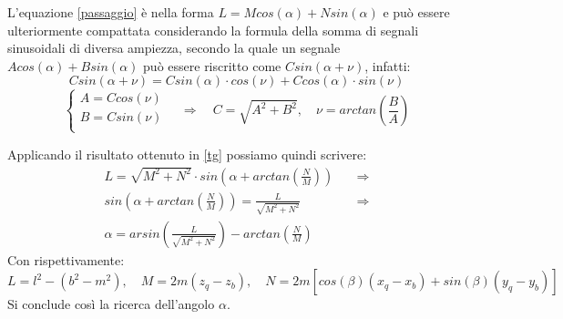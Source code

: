 \documentclass[11pt]{article}
\begin{document}
L'equazione \eqref{passaggio} è nella forma $L=Mcos(\alpha)+Nsin(\alpha)$ e può essere ulteriormente compattata considerando la formula della somma di segnali sinusoidali di diversa ampiezza, secondo la quale un segnale $Acos(\alpha)+Bsin(\alpha)$ può essere riscritto come $Csin(\alpha + \nu)$, infatti:
\begin{equation}\label{c}
Csin(\alpha + \nu)=Csin(\alpha)\cdot cos(\nu)+Ccos(\alpha)\cdot sin(\nu)
\end{equation}
\begin{equation}\label{tg}
    \begin{cases}
      A=Ccos(\nu)\\
      B=Csin(\nu)\\
    \end{cases}\quad \Rightarrow \quad  C=\sqrt{A^2+B^2}, \quad \nu=arctan\left(\frac{B}{A}\right)
\end{equation}

Applicando il risultato ottenuto in \eqref{tg} possiamo quindi scrivere:
\begin{align}\label{alfa}
    L= \sqrt{M^2+N^2}\cdot sin\left(\alpha+arctan\left(\frac{N}{M}\right)\right) \quad  &\Rightarrow\\ sin\left(\alpha+arctan\left(\frac{N}{M}\right)\right)=\frac{L}{\sqrt{M^2+N^2}}  \quad  &\Rightarrow\\
    \alpha=arsin\left(\frac{L}{\sqrt{M^2+N^2}}\right)-arctan\left(\frac{N}{M}\right)
\end{align}
Con rispettivamente:
\begin{equation}\label{lnm}
L=l^2-(b^2-m^2), \quad M=2m(z_q-z_b), \quad N=2m[cos(\beta)(x_q-x_b)+sin(\beta)(y_q-y_b)]
\end{equation}
Si conclude così la ricerca dell'angolo $\alpha$.
\end{document}
